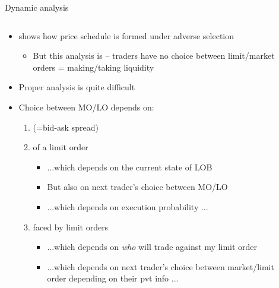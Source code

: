\documentclass[english,10pt
,aspectratio=169
]{beamer}
\begin{document}
\begin{frame}{Dynamic analysis}
	\begin{columns}
		\begin{column}{0.7\linewidth}
			\begin{itemize}
				\item \cite{glosten_is_1994} shows how price schedule is formed under adverse selection
				\begin{itemize}
					\item But this analysis is  -- traders have no choice between limit/market orders = making/taking liquidity
				\end{itemize}
				\item Proper  analysis is quite difficult
				\pause
				\item Choice between \alert{MO/LO} depends on:
				\begin{enumerate}
					\item {} (=bid-ask spread)
					\pause
					\item {} of a limit order
					\begin{itemize}
						\item ...which depends on the current state of LOB
						\item But also on next trader's choice between MO/LO
						\item ...which depends on execution probability ...
					\end{itemize}
					\pause
					\item {} faced by limit orders
					\begin{itemize}
						\item ...which depends on \emph{who} will trade against my limit order
						\item ...which depends on next trader's choice between market/limit order depending on their pvt info ...
					\end{itemize}
				\end{enumerate}
			\end{itemize}
		\end{column}
		\begin{column}{0.3\linewidth}
			\pause[2]
			\visible<handout:0>{
				\texttt{[image: pics/thonk]}
				\vspace{7em}
			}
		\end{column}
	\end{columns}
\end{frame}
\end{document}
